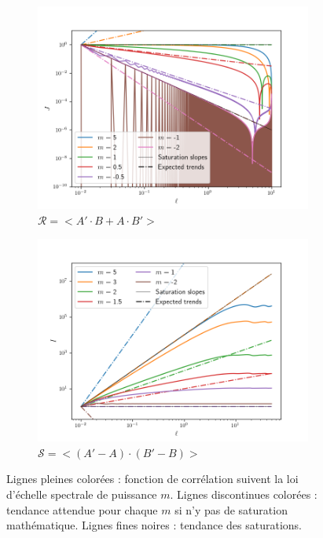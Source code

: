   \begin{figure}[htpb]
\center
      \begin{subfigure}[b]{0.496\textwidth}
          \centering
          \includegraphics[width=\textwidth,trim = 0.5cm 0.5cm 2cm 2cm, clip]{./Mainmatter/Part_Appendix/images/sat_cor}
          \caption{\ensuremath{\mathcal{R} = <A'\cdot B + A\cdot B'>} }
          \label{fig:sat_corr}
      \end{subfigure}
      \hfill
      \begin{subfigure}[b]{0.496\textwidth}
          \centering
          \includegraphics[width=\textwidth,trim = 0.5cm 0.5cm 2cm 2cm, clip]{./Mainmatter/Part_Appendix/images/sat_inc}
          \cprotect\caption{\ensuremath{\mathcal{S}=<\left(A'-A\right)\cdot\left(B'-B\right)>} }
          \label{fig:sat_inc}
      \end{subfigure}
         \cprotect\caption{Lignes pleines colorées : fonction de corrélation suivent la loi d'échelle spectrale de puissance \ensuremath{m}. Lignes discontinues colorées : tendance attendue pour chaque \ensuremath{m} si n'y pas de saturation mathématique. Lignes fines noires : tendance des saturations. }
        \label{fig:sat_trends}
  \end{figure}
